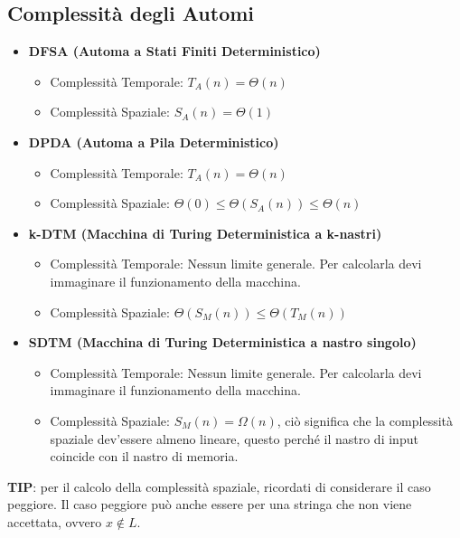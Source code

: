 \subsection{Complessità degli Automi}
\begin{itemize}
    \item \textbf{DFSA (Automa a Stati Finiti Deterministico)}
    \begin{itemize}
        \item Complessità Temporale: $T_A(n) = \Theta(n)$
        \item Complessità Spaziale: $S_A(n) = \Theta(1)$
    \end{itemize}

    \item \textbf{DPDA (Automa a Pila Deterministico)}
    \begin{itemize}
        \item Complessità Temporale: $T_A(n) = \Theta(n)$
        \item Complessità Spaziale: $\Theta(0) \le \Theta(S_A(n)) \le \Theta(n)$
    \end{itemize}

    \item \textbf{k-DTM (Macchina di Turing Deterministica a k-nastri)}
    \begin{itemize}
        \item Complessità Temporale: Nessun limite generale. Per calcolarla devi immaginare il funzionamento della macchina.
        \item Complessità Spaziale: $\Theta(S_M(n)) \le \Theta(T_M(n))$
    \end{itemize}

    \item \textbf{SDTM (Macchina di Turing Deterministica a nastro singolo)}
    \begin{itemize}
        \item Complessità Temporale: Nessun limite generale. Per calcolarla devi immaginare il funzionamento della macchina.
        \item Complessità Spaziale: $S_M(n) = \Omega(n)$, ciò significa che la complessità spaziale dev'essere almeno lineare, questo perché il nastro di input coincide con il nastro di memoria.
    \end{itemize}
\end{itemize}

\textbf{TIP}: per il calcolo della complessità spaziale, ricordati di considerare il caso peggiore. Il caso peggiore può anche essere per una stringa che non viene accettata, ovvero $x \notin L$.